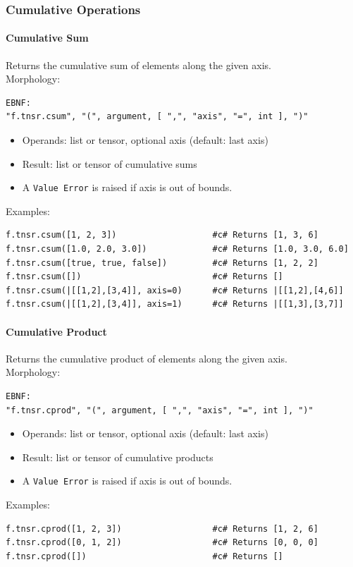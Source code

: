 \subsubsection{Cumulative Operations}

\paragraph{Cumulative Sum}
Returns the cumulative sum of elements along the given axis.\\
Morphology:
\begin{verbatim}
EBNF:
"f.tnsr.csum", "(", argument, [ ",", "axis", "=", int ], ")"
\end{verbatim}
\begin{itemize}
\item Operands: list or tensor, optional axis (default: last axis)
\item Result: list or tensor of cumulative sums
\item A \texttt{Value Error} is raised if axis is out of bounds.
\end{itemize}
Examples:
\begin{verbatim}
f.tnsr.csum([1, 2, 3])                   #c# Returns [1, 3, 6]
f.tnsr.csum([1.0, 2.0, 3.0])             #c# Returns [1.0, 3.0, 6.0]
f.tnsr.csum([true, true, false])         #c# Returns [1, 2, 2]
f.tnsr.csum([])                          #c# Returns []
f.tnsr.csum(|[[1,2],[3,4]], axis=0)      #c# Returns |[[1,2],[4,6]]
f.tnsr.csum(|[[1,2],[3,4]], axis=1)      #c# Returns |[[1,3],[3,7]]
\end{verbatim}

\paragraph{Cumulative Product}
Returns the cumulative product of elements along the given axis.\\
Morphology:
\begin{verbatim}
EBNF:
"f.tnsr.cprod", "(", argument, [ ",", "axis", "=", int ], ")"
\end{verbatim}
\begin{itemize}
\item Operands: list or tensor, optional axis (default: last axis)
\item Result: list or tensor of cumulative products
\item A \texttt{Value Error} is raised if axis is out of bounds.
\end{itemize}
Examples:
\begin{verbatim}
f.tnsr.cprod([1, 2, 3])                  #c# Returns [1, 2, 6]
f.tnsr.cprod([0, 1, 2])                  #c# Returns [0, 0, 0]
f.tnsr.cprod([])                         #c# Returns []
\end{verbatim}

